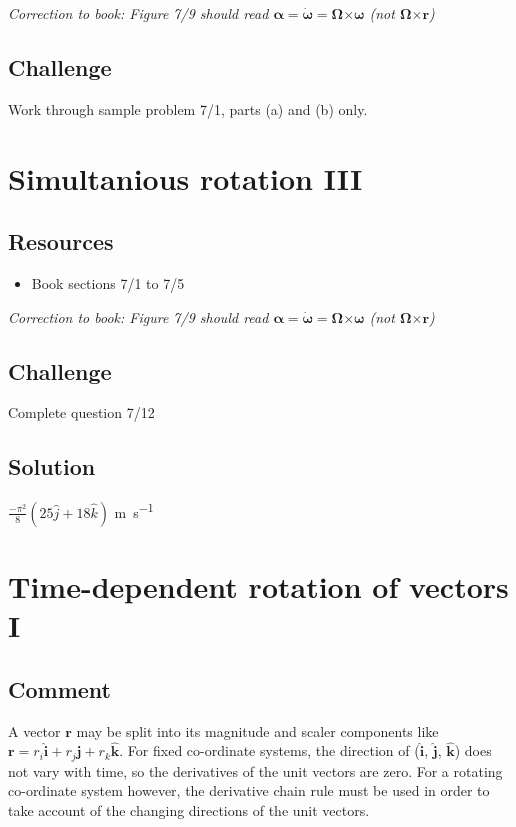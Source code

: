 \emph{Correction to book: Figure 7/9 should read $\bm{\alpha} = \bm{\dot{\omega}} = \bm{\Omega} \bm{\times} \bm{\omega}$ (not $\bm{\Omega} \bm{\times} \bm{r}$)}

\subsection*{Challenge}
Work through sample problem 7/1, parts (a) and (b) only.




\newpage
\section{Simultanious rotation III}

\subsection*{Resources}
\begin{itemize}
    \item Book sections 7/1 to 7/5
\end{itemize}

\emph{Correction to book: Figure 7/9 should read $\bm{\alpha} = \bm{\dot{\omega}} = \bm{\Omega} \bm{\times} \bm{\omega}$ (not $\bm{\Omega} \bm{\times} \bm{r}$)}

\subsection*{Challenge}
Complete question 7/12


\subsection*{Solution}
$\frac{-\pi^2}{8}(25 \hat{j} + 18 \hat{k})$ \si{\meter\per\second}




\newpage
\section{Time-dependent rotation of vectors I}

\subsection*{Comment}
A vector $\bm{r}$ may be split into its magnitude and scaler components like $\bm{r} = r_i \bm{\hat{i}} + r_j \bm{\hat{j}} + r_k \bm{\hat{k}}$. For fixed co-ordinate systems, the direction of ($\bm{\hat{i}}$, $\bm{\hat{j}}$, $\bm{\hat{k}}$) does not vary with time, so the derivatives of the unit vectors are zero. For a rotating co-ordinate system however, the derivative chain rule must be used in order to take account of the changing directions of the unit vectors.

